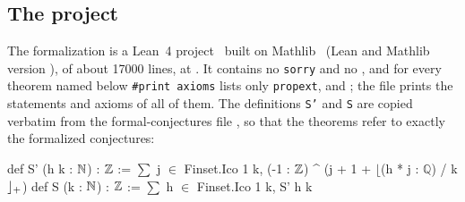 \subsection*{The project}
The formalization is a Lean~4 project~\cite{b35} built on Mathlib~\cite{b34} (Lean and Mathlib version ), of about 17000 lines, at \zenododoi. It contains no \texttt{sorry} and no , and for every theorem named below \texttt{\#print axioms} lists only \texttt{propext},  and ; the file  prints the statements and axioms of all of them. The definitions \texttt{S'} and \texttt{S} are copied verbatim from the formal-conjectures file  \cite{b11}, so that the theorems refer to exactly the formalized conjectures:
\begin{leancode}
def S' (h k : $\mathbb{N}$) : $\mathbb{Z}$ :=
  $\sum$ j $\in$ Finset.Ico 1 k, (-1 : $\mathbb{Z}$) ^ (j + 1 + $\lfloor$(h * j : $\mathbb{Q}$) / k$\rfloor\sb{+}$)
def S (k : $\mathbb{N}$) : $\mathbb{Z}$ := $\sum$ h $\in$ Finset.Ico 1 k, S' h k
\end{leancode}

